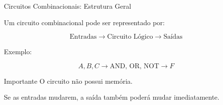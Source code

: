 
\begin{frame}{Circuitos Combinacionais: Estrutura Geral}

    Um circuito combinacional pode ser representado por:

    \[
        \boxed{\text{Entradas}}
        \longrightarrow
        \boxed{\text{Circuito Lógico}}
        \longrightarrow
        \boxed{\text{Saídas}}
    \]

    \vspace{0.5cm}

    Exemplo:

    \[
        A,B,C
        \longrightarrow
        \boxed{\text{AND, OR, NOT}}
        \longrightarrow
        F
    \]

    \vspace{0.5cm}

    \begin{alertblock}{Importante}
        O circuito não possui memória.

        Se as entradas mudarem, a saída também poderá mudar imediatamente.
    \end{alertblock}

\end{frame}